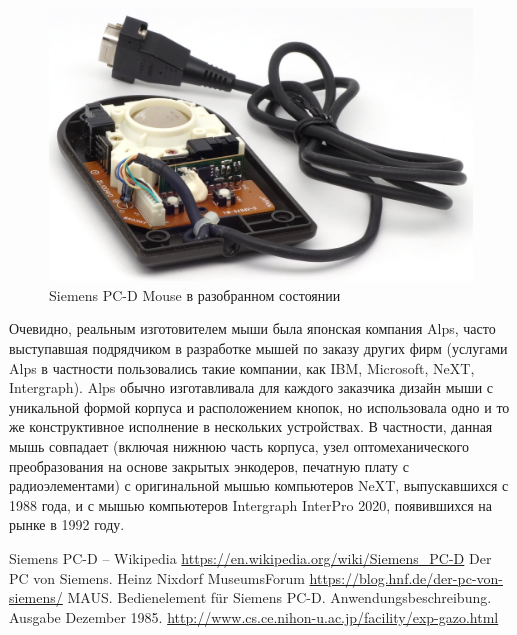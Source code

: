 \documentclass[11pt, a4paper]{article}
\begin{document}
\begin{figure}[h]
    \centering
    \includegraphics[scale=0.8]{1985_siemens_pcd_mouse/inside_30.jpg} 
    \caption{Siemens PC-D Mouse в разобранном состоянии}
    \label{fig:SiemensPCDInside}
\end{figure}

Очевидно, реальным изготовителем мыши была японская компания Alps, часто выступавшая подрядчиком в разработке мышей по заказу других фирм (услугами Alps в частности пользовались такие компании, как IBM, Microsoft, NeXT, Intergraph). Alps обычно изготавливала для каждого заказчика дизайн мыши с уникальной формой корпуса и расположением кнопок, но использовала одно и то же конструктивное исполнение в нескольких устройствах. В частности, данная мышь совпадает (включая нижнюю часть корпуса, узел оптомеханического преобразования на основе закрытых энкодеров, печатную плату с радиоэлементами) с оригинальной мышью компьютеров NeXT, выпускавшихся с 1988 года, и с мышью компьютеров Intergraph InterPro 2020, появившихся на рынке в 1992 году.

\begin{thebibliography}{9}
 Siemens PC-D -- Wikipedia \url{https://en.wikipedia.org/wiki/Siemens_PC-D}
 Der PC von Siemens. Heinz Nixdorf MuseumsForum \url{https://blog.hnf.de/der-pc-von-siemens/}
 MAUS. Bedienelement für Siemens PC-D. Anwendungsbeschreibung. Ausgabe Dezember 1985. \url{http://www.cs.ce.nihon-u.ac.jp/facility/exp-gazo.html}
\end{thebibliography}
\end{document}

